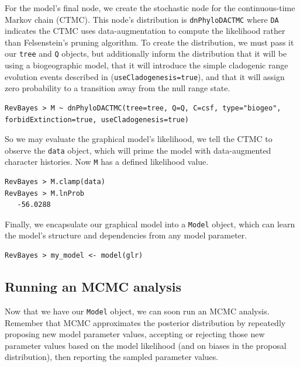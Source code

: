 For the model's final node, we create the stochastic node for the continuous-time Markov chain (CTMC).
This node's distribution is {\tt dnPhyloDACTMC} where {\tt DA} indicates the CTMC uses data-augmentation to compute the likelihood rather than Felsenstein's pruning algorithm.
To create the distribution, we must pass it our {\tt tree} and {\tt Q} objects, but additionally inform the distribution that it will be using a biogeographic model, that it will introduce the simple cladogenic range evolution events described in \citet{ree08} ({\tt useCladogenesis=true}), and that it will assign zero probability to a transition away from the null range state.

\begin{snugshade}
\begin{lstlisting}
RevBayes > M ~ dnPhyloDACTMC(tree=tree, Q=Q, C=csf, type="biogeo", forbidExtinction=true, useCladogenesis=true)
\end{lstlisting}
\end{snugshade}

So we may evaluate the graphical model's likelihood, we tell the CTMC to observe the {\tt data} object, which will prime the model with data-augmented character histories.
Now {\tt M} has a defined likelihood value.
\begin{snugshade}
\begin{lstlisting}
RevBayes > M.clamp(data)
RevBayes > M.lnProb
   -56.0288
\end{lstlisting}
\end{snugshade}

Finally, we encapsulate our graphical model into a {\tt Model} object, which can learn the model's structure and dependencies from any model parameter.
\begin{snugshade}
\begin{lstlisting}
RevBayes > my_model <- model(glr)
\end{lstlisting}
\end{snugshade}

\subsection{Running an MCMC analysis}

Now that we have our {\tt Model} object, we can soon run an MCMC analysis.
Remember that MCMC approximates the posterior distribution by repeatedly proposing new model parameter values, accepting or rejecting those new parameter values based on the model likelihood (and on biases in the proposal distribution), then reporting the sampled parameter values.

